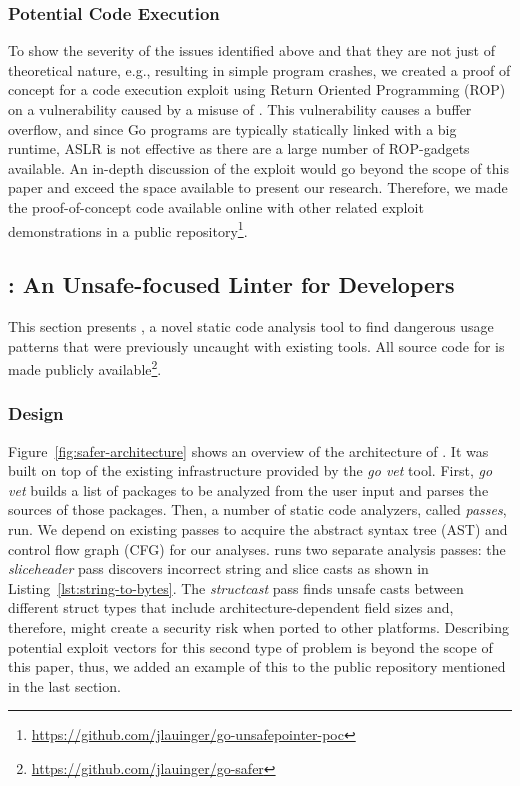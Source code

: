 \subsubsection*{Potential Code Execution}

To show the severity of the issues identified above and that they are not just of theoretical nature, e.g., resulting in simple program crashes, we created a proof of concept for a code execution exploit using Return Oriented Programming (ROP) on a vulnerability caused by a misuse of \unsafe{}.
This vulnerability causes a buffer overflow, and since Go programs are typically statically linked with a big runtime, ASLR is not effective as there are a large number of ROP-gadgets available.
An in-depth discussion of the exploit would go beyond the scope of this paper and exceed the space available to present our research.
Therefore, we made the proof-of-concept code available online with other related exploit demonstrations in a public repository\footnote{\url{https://github.com/jlauinger/go-unsafepointer-poc}}. 



\subsection{\toolSA{}: An Unsafe-focused Linter for Developers}

This section presents \toolSA{}, a novel static code analysis tool to find dangerous \unsafe{} usage patterns that were previously uncaught with existing tools.
All source code for \toolSA{} is made publicly available\footnote{\url{https://github.com/jlauinger/go-safer}}.

\subsubsection*{Design}

Figure~\ref{fig:safer-architecture} shows an overview of the architecture of \toolSA{}.
It was built on top of the existing infrastructure provided by the \textit{go vet} tool.
First, \textit{go vet} builds a list of packages to be analyzed from the user input and parses the sources of those packages.
Then, a number of static code analyzers, called \textit{passes}, run.
We depend on existing passes to acquire the abstract syntax tree (AST) and control flow graph (CFG) for our analyses.
\toolSA{} runs two separate analysis passes: the \textit{sliceheader} pass discovers incorrect string and slice casts as shown in Listing~\ref{lst:string-to-bytes}.
The \textit{structcast} pass finds unsafe casts between different struct types that include architecture-dependent field sizes and, therefore, might create a security risk when ported to other platforms.
Describing potential exploit vectors for this second type of problem is beyond the scope of this paper, thus, we added an example of this to the public repository mentioned in the last section.

